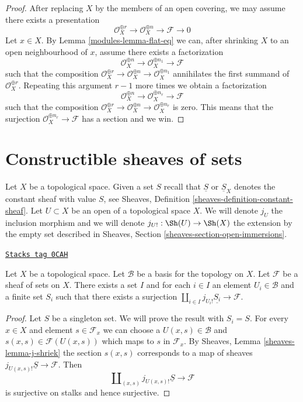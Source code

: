 \begin{proof}

After replacing $X$ by the members of an open covering, we may
assume there exists a presentation
$$
\mathcal{O}_X^{\oplus r} \to
\mathcal{O}_X^{\oplus n} \to \mathcal{F} \to 0
$$
Let $x \in X$. By Lemma \ref{modules-lemma-flat-eq}
we can, after shrinking $X$ to an open
neighbourhood of $x$, assume there exists a factorization
$$
\mathcal{O}_X^{\oplus n} \to
\mathcal{O}_X^{\oplus n_1} \to \mathcal{F}
$$
such that the composition
$\mathcal{O}_X^{\oplus r} \to \mathcal{O}_X^{\oplus n} \to
\mathcal{O}_X^{\oplus n_1}$
annihilates the first summand of $\mathcal{O}_X^{\oplus r}$.
Repeating this argument $r - 1$ more times we obtain a factorization
$$
\mathcal{O}_X^{\oplus n} \to
\mathcal{O}_X^{\oplus n_r} \to \mathcal{F}
$$
such that the composition
$\mathcal{O}_X^{\oplus r} \to \mathcal{O}_X^{\oplus n}
\to \mathcal{O}_X^{\oplus n_r}$ is zero.
This means that the surjection $\mathcal{O}_X^{\oplus n_r} \to \mathcal{F}$
has a section and we win.
\end{proof}

\section{Constructible sheaves of sets}
\label{modules-section-constructible}
Let $X$ be a topological space. Given a set $S$ recall that $\underline{S}$
or $\underline{S}_X$ denotes the constant sheaf with value $S$, see
Sheaves, Definition \ref{sheaves-definition-constant-sheaf}.
Let $U \subset X$ be an open of a topological space $X$.
We will denote $j_U$ the inclusion morphism and we will denote
$j_{U!} : \Sh(U) \to \Sh(X)$ the extension by the empty set
described in Sheaves, Section \ref{sheaves-section-open-immersions}.

\begin{lemma}[Surjection]
\label{modules-lemma-surjection}
\href{https://stacks.math.columbia.edu/tag/0CAH}{\texttt{Stacks tag 0CAH}}

Let $X$ be a topological space. Let $\mathcal{B}$ be a basis for the
topology on $X$. Let $\mathcal{F}$ be a sheaf of sets on $X$.
There exists a set $I$ and for each $i \in I$ an element
$U_i \in \mathcal{B}$ and a finite set $S_i$ such that there exists
a surjection $\coprod_{i \in I} j_{U_i!}\underline{S_i} \to \mathcal{F}$.
\end{lemma}

\begin{proof}
Let $S$ be a singleton set. We will prove the result with $S_i = S$.
For every $x \in X$ and element $s \in \mathcal{F}_x$ we can choose
a $U(x, s) \in \mathcal{B}$ and $s(x, s) \in \mathcal{F}(U(x, s))$
which maps to $s$ in $\mathcal{F}_x$. By
Sheaves, Lemma \ref{sheaves-lemma-j-shriek}
the section $s(x, s)$
corresponds to a map of sheaves $j_{U(x, s)!}\underline{S} \to \mathcal{F}$.
Then
$$
\coprod\nolimits_{(x, s)} j_{U(x, s)!}\underline{S} \to \mathcal{F}
$$
is surjective on stalks and hence surjective.
\end{proof}

